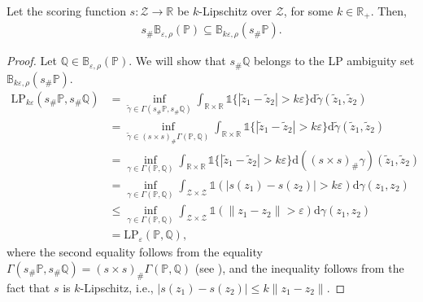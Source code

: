 \documentclass[11pt,a4paper]{article}
\begin{document}
\begin{prop}
\label{prop:propagation:LP}
Let the scoring function $s:\mathcal Z \to \mathbb R$ be $k$-Lipschitz over $\mathcal Z$, for some $k \in \mathbb R_+$. Then,
\begin{align}
\label{eq:propagation:LP}
    s_\# \mathbb{B}_{\varepsilon,\rho}(\mathbb P) \subseteq \mathbb{B}_{k \varepsilon, \rho}(s_\# \mathbb P).
\end{align}
\end{prop}
\begin{proof}
Let $\mathbb Q \in \mathbb{B}_{\varepsilon,\rho}(\mathbb P)$. We will show that $s_\# \mathbb Q$ belongs to the LP ambiguity set $\mathbb{B}_{k \varepsilon, \rho}(s_\# \mathbb P)$.
\begin{align*}
    \text{LP}_{k\varepsilon}(s_\# \mathbb P, s_\# \mathbb Q) &=\inf_{\tilde\gamma\in\Gamma(s_\# \mathbb P, s_\# \mathbb Q)}\int_{\mathbb R \times \mathbb R}\mathds{1}\{|\tilde{z}_1-\tilde{z}_2|>k\varepsilon\}\mathrm{d}\tilde{\gamma}(\tilde{z}_1, \tilde{z}_2)\\
    &= \inf_{\tilde\gamma\in(s\times s)_\#\Gamma(\mathbb P, \mathbb Q)}\int_{\mathbb R \times \mathbb R} \mathds{1}\{|\tilde{z}_1-\tilde{z}_2|>k\varepsilon\}\mathrm{d}\tilde{\gamma}(\tilde{z}_1, \tilde{z}_2)\\
    &= \inf_{\gamma\in\Gamma(\mathbb P, \mathbb Q)}\int_{\mathbb R \times \mathbb R}\mathds{1}\{|\tilde{z}_1 - \tilde{z}_2|>k\varepsilon\}\mathrm{d}((s\times s)_\# \gamma)(\tilde{z}_1, \tilde{z}_2)\\
    &=\inf_{\gamma\in\Gamma(\mathbb P, \mathbb Q)}\int_{\mathcal Z \times \mathcal Z} \mathds{1}(|s(z_1)-s(z_2)|>k\varepsilon)\mathrm{d}\gamma(z_1,z_2)\\
    &\leq\inf_{\gamma\in\Gamma(\mathbb P, \mathbb Q)}\int_{\mathcal Z \times \mathcal Z}\mathds{1}(\|z_1-z_2\|>\varepsilon)\mathrm{d}\gamma(z_1,z_2) \\
    &= \text{LP}_{\varepsilon}(\mathbb P, \mathbb Q),
\end{align*}
where the second equality follows from the equality $\Gamma(s_\# \mathbb P, s_\# \mathbb Q) = (s\times s)_\#\Gamma(\mathbb P, \mathbb Q)$ (see \cite[Lemma~2]{Aolaritei_2023}), and the inequality follows from the fact that $s$ is $k$-Lipschitz, i.e., $|s(z_1)-s(z_2)| \leq k \|z_1-z_2\|$.
\end{proof}
\end{document}

